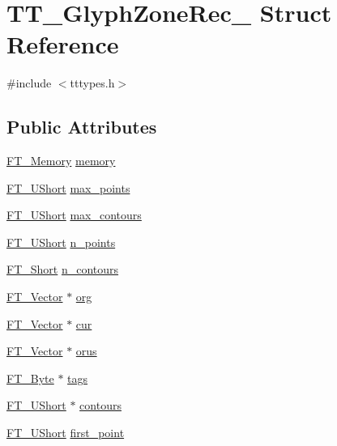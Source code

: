 \hypertarget{struct_t_t___glyph_zone_rec__}{\section{T\-T\-\_\-\-Glyph\-Zone\-Rec\-\_\- Struct Reference}
\label{struct_t_t___glyph_zone_rec__}
}


{\ttfamily \#include $<$tttypes.\-h$>$}

\subsection*{Public Attributes}
\begin{DoxyCompactItemize}
\item 
\hyperlink{ftsystem_8h_a67ec7ea35cde99a89a65e9f827a9ad3a}{F\-T\-\_\-\-Memory} \hyperlink{struct_t_t___glyph_zone_rec___adc8cac6d6d8475aa50946d6bc17fd345}{memory}
\item 
\hyperlink{fttypes_8h_a937f6c17cf5ffd09086d8610c37b9f58}{F\-T\-\_\-\-U\-Short} \hyperlink{struct_t_t___glyph_zone_rec___aa06aa1bfd1b7e2082552ea24f96c775e}{max\-\_\-points}
\item 
\hyperlink{fttypes_8h_a937f6c17cf5ffd09086d8610c37b9f58}{F\-T\-\_\-\-U\-Short} \hyperlink{struct_t_t___glyph_zone_rec___a268ef8e7a7da1c077c762d04089b2605}{max\-\_\-contours}
\item 
\hyperlink{fttypes_8h_a937f6c17cf5ffd09086d8610c37b9f58}{F\-T\-\_\-\-U\-Short} \hyperlink{struct_t_t___glyph_zone_rec___a2acc389958f0e593f7eed29f7ca15b94}{n\-\_\-points}
\item 
\hyperlink{fttypes_8h_aa7279be89046a2563cd3d4d6651fbdcf}{F\-T\-\_\-\-Short} \hyperlink{struct_t_t___glyph_zone_rec___a1aa2ffa863fbd8a8985fe3e39e8bb92a}{n\-\_\-contours}
\item 
\hyperlink{ftimage_8h_ab158b5a7e422acb1968af95db786d018}{F\-T\-\_\-\-Vector} $\ast$ \hyperlink{struct_t_t___glyph_zone_rec___a240879d0a1a6dd487b84f3b3723f9058}{org}
\item 
\hyperlink{ftimage_8h_ab158b5a7e422acb1968af95db786d018}{F\-T\-\_\-\-Vector} $\ast$ \hyperlink{struct_t_t___glyph_zone_rec___a5dc4b386729ab85619a7132f69714991}{cur}
\item 
\hyperlink{ftimage_8h_ab158b5a7e422acb1968af95db786d018}{F\-T\-\_\-\-Vector} $\ast$ \hyperlink{struct_t_t___glyph_zone_rec___a4b4193dbae177435cb6515f9a0537fa0}{orus}
\item 
\hyperlink{fttypes_8h_a51f26183ca0c9f4af958939648caeccd}{F\-T\-\_\-\-Byte} $\ast$ \hyperlink{struct_t_t___glyph_zone_rec___ae816c5c1096e333741d3f3f9d3ae0a8f}{tags}
\item 
\hyperlink{fttypes_8h_a937f6c17cf5ffd09086d8610c37b9f58}{F\-T\-\_\-\-U\-Short} $\ast$ \hyperlink{struct_t_t___glyph_zone_rec___ad16498cac0d4d233dce009eb74d63de1}{contours}
\item 
\hyperlink{fttypes_8h_a937f6c17cf5ffd09086d8610c37b9f58}{F\-T\-\_\-\-U\-Short} \hyperlink{struct_t_t___glyph_zone_rec___a9d655be80b3e31652f69ede54458faaf}{first\-\_\-point}
\end{DoxyCompactItemize}


